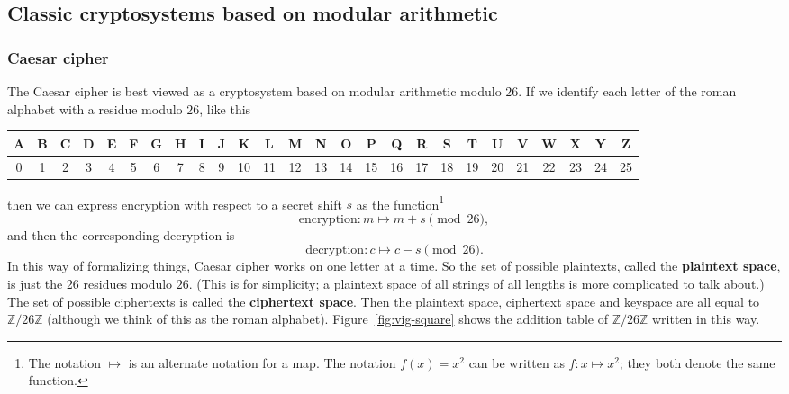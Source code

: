 \documentclass{article}
\theoremstyle{plain}
\theoremstyle{definition}
\theoremstyle{remark}
\numberwithin{theorem}{section}
\newcommand{\ZZ}{\mathbb{Z}}
\begin{document}
\subsection{Classic cryptosystems based on modular arithmetic}

\subsubsection{Caesar cipher}

The Caesar cipher is best viewed as a cryptosystem based on modular arithmetic modulo $26$.  If we identify each letter of the roman alphabet with a residue modulo $26$, like this

\begin{center}
\small
\setlength{\tabcolsep}{3.5pt}
\begin{tabular}{*{26}{c}}
A & B & C & D & E & F & G & H & I & J & K & L & M & N & O & P & Q & R & S & T & U & V & W & X & Y & Z \\
\hline
0 & 1 & 2 & 3 & 4 & 5 & 6 & 7 & 8 & 9 & 10 & 11 & 12 & 13 & 14 & 15 & 16 & 17 & 18 & 19 & 20 & 21 & 22 & 23 & 24 & 25
\end{tabular}
\end{center}

then we can express encryption with respect to a secret shift $s$ as the function\footnote{The notation $\mapsto$ is an alternate notation for a map.  The notation $f(x) = x^2$ can be written as $f: x \mapsto x^2$; they both denote the same function.}
\[
	\text{encryption}: m \mapsto m + s \pmod{26},
\]
and then the corresponding decryption is
\[
\text{decryption}: c \mapsto c - s \pmod{26}.
\]
In this way of formalizing things, Caesar cipher works on one letter at a time.  So the set of possible plaintexts, called the \textbf{plaintext space}, is just the 26 residues modulo $26$.  (This is for simplicity; a plaintext space of all strings of all lengths is more complicated to talk about.)  The set of possible ciphertexts is called the \textbf{ciphertext space}.
Then the {plaintext space}, {ciphertext space} and keyspace are all equal to $\ZZ/26\ZZ$ (although we think of this as the roman alphabet).  Figure~\ref{fig:vig-square} shows the addition table of $\ZZ/26\ZZ$ written in this way.
\end{document}
